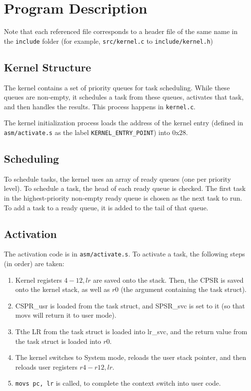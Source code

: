 \documentclass{article}
\begin{document}
\section{Program Description}
Note that each referenced file corresponds to a header file of the same name in the \verb|include| folder (for example, \verb|src/kernel.c| to \verb|include/kernel.h|)
\subsection{Kernel Structure}
The kernel contains a set of priority queues for task scheduling. While these queues are non-empty, it schedules a task from these queues, activates that task, and then handles the results. This process happens in \verb|kernel.c|.

The kernel initialization process loads the address of the kernel entry (defined in \verb|asm/activate.s| as the label \verb|KERNEL_ENTRY_POINT|) into $0$x$28$.
\subsection{Scheduling}

To schedule tasks, the kernel uses an array of ready queues (one per priority level). To schedule a task, the head of each ready queue is checked. The first task in the highest-priority non-empty ready queue is chosen as the next task to run. 
To add a task to a ready queue, it is added to the tail of that queue.

\subsection{Activation}
The activation code is in \verb|asm/activate.s|. To activate a task, the following steps (in order) are taken:
\begin{enumerate}
\item Kernel registers $4-12, lr$ are saved onto the stack. Then, the CPSR is saved onto the kernel stack, as well as $r0$ (the argument containing the task struct).
\item CSPR\_usr is loaded from the task struct, and SPSR\_svc is set to it (so that movs will return it to user mode).
\item Tthe LR from the task struct is loaded into lr\_svc, and the return value from the task struct is loaded into $r0$.
\item The kernel switches to System mode, reloads the user stack pointer, and then reloads user registers $r4-r12, lr$.
\item \verb|movs pc, lr| is called, to complete the context switch into user code.
\end{enumerate}
\end{document}

